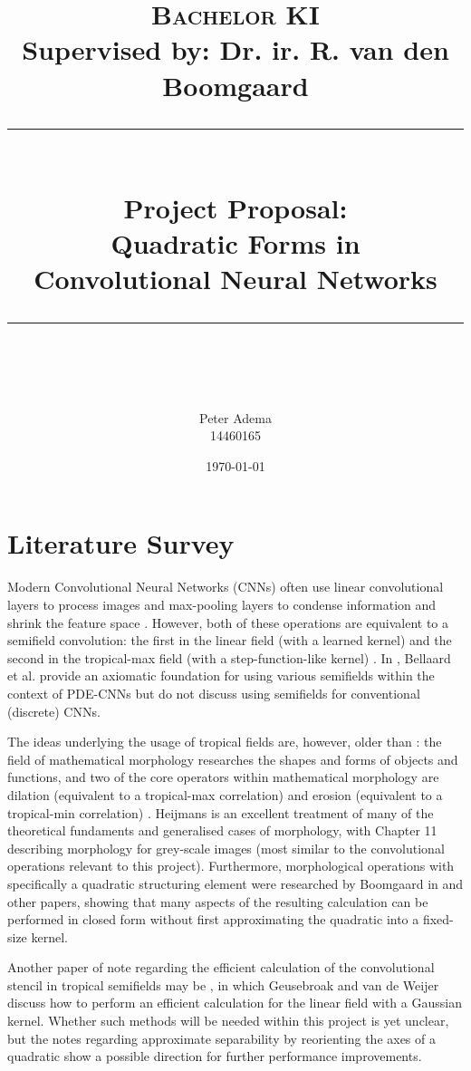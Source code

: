 \documentclass[11pt]{article} %
\title{	
    \vspace*{-1.5cm}
	\normalfont\normalsize
	\textsc{Bachelor KI}\\ Supervised by: Dr. ir. R. van den Boomgaard\\ %
	\vspace{3pt}
	\rule{\linewidth}{0.5pt}\\
	{\huge Project Proposal:\\Quadratic Forms in\\ Convolutional Neural Networks}\\ %
	\vspace{4pt}
	\rule{\linewidth}{2pt}\\
	\vspace{4pt}
}
\author{
    \Large Peter Adema \\ 14460165
}
\date{\normalsize\today}  %
\begin{document}
\maketitle %

\section{Literature Survey}
Modern Convolutional Neural Networks (CNNs) often use linear convolutional layers to process images and max-pooling layers to condense information and shrink the feature space \cite{introconvnets}. However, both of these operations are equivalent to a semifield convolution: the first in the linear field (with a learned kernel) and the second in the tropical-max field (with a step-function-like kernel) \cite{bellaardaxiomatic}. In \cite{bellaardaxiomatic}, Bellaard et al. provide an axiomatic foundation for using various semifields within the context of PDE-CNNs but do not discuss using semifields for conventional (discrete) CNNs. 

The ideas underlying the usage of tropical fields are, however, older than \cite{bellaardaxiomatic}: the field of mathematical morphology researches the shapes and forms of objects and functions, and two of the core operators within mathematical morphology are dilation (equivalent to a tropical-max correlation) and erosion (equivalent to a tropical-min correlation) \cite{maragos}. Heijmans \cite{heijmans1996morphological} is an excellent treatment of many of the theoretical fundaments and generalised cases of morphology, with Chapter 11 describing morphology for grey-scale images (most similar to the convolutional operations relevant to this project). Furthermore, morphological operations with specifically a quadratic structuring element were researched by Boomgaard in \cite{Boomgaard1999NumericalSS} and other papers, showing that many aspects of the resulting calculation can be performed in closed form without first approximating the quadratic into a fixed-size kernel.

Another paper of note regarding the efficient calculation of the convolutional stencil in tropical semifields may be \cite{fastanifilter}, in which Geusebroak and van de Weijer discuss how to perform an efficient calculation for the linear field with a Gaussian kernel. Whether such methods will be needed within this project is yet unclear, but the notes regarding approximate separability by reorienting the axes of a quadratic show a possible direction for further performance improvements.
\end{document}
